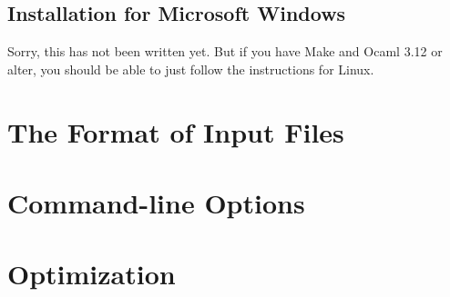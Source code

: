 \documentclass{report}
\begin{document}
\section{Installation for Microsoft Windows}
\label{sec:comp-inst-micr}

Sorry, this has not been written yet. But if you have Make and Ocaml
3.12 or alter, you should be able to just follow the instructions for
Linux.

\chapter{The Format of Input Files}
\label{sec:input-files}

\chapter{Command-line Options}
\label{sec:command-line-options}

\chapter{Optimization}
\label{sec:optimization}
\end{document}

